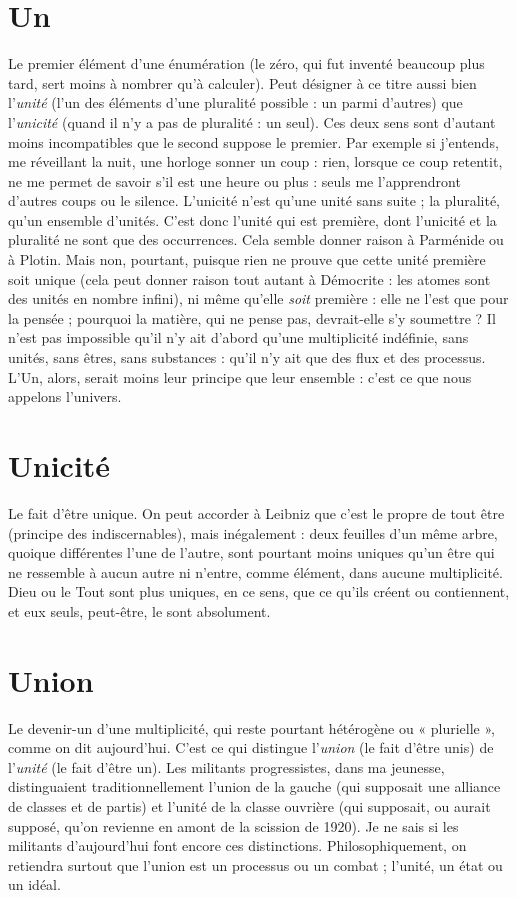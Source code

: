 \section{Un}
Le premier élément d’une énumération (le zéro, qui fut inventé beaucoup
plus tard, sert moins à nombrer qu’à calculer). Peut désigner à ce
titre aussi bien l’{\it unité} (l’un des éléments d’une pluralité possible : un parmi
d’autres) que l’{\it unicité} (quand il n’y a pas de pluralité : un seul). Ces deux
sens sont d’autant moins incompatibles que le second suppose le premier.
Par exemple si j'entends, me réveillant la nuit, une horloge sonner un coup :
rien, lorsque ce coup retentit, ne me permet de savoir s’il est une heure ou
plus : seuls me l’apprendront d’autres coups ou le silence. L’unicité n’est
qu’une unité sans suite ; la pluralité, qu’un ensemble d’unités. C’est donc
l'unité qui est première, dont l’unicité et la pluralité ne sont que des occurrences.
Cela semble donner raison à Parménide ou à Plotin. Mais non, pourtant,
puisque rien ne prouve que cette unité première soit unique (cela peut
donner raison tout autant à Démocrite : les atomes sont des unités en
nombre infini), ni même qu’elle {\it soit} première : elle ne l’est que pour la
pensée ; pourquoi la matière, qui ne pense pas, devrait-elle s’y soumettre ? Il
n’est pas impossible qu’il n’y ait d’abord qu’une multiplicité indéfinie, sans
unités, sans êtres, sans substances : qu’il n’y ait que des flux et des processus.
L'Un, alors, serait moins leur principe que leur ensemble : c’est ce que nous
appelons l’univers.

\section{Unicité}
Le fait d’être unique. On peut accorder à Leibniz que c’est le
propre de tout être (principe des indiscernables), mais inégalement :
deux feuilles d’un même arbre, quoique différentes l’une de l’autre, sont
pourtant moins uniques qu'un être qui ne ressemble à aucun autre ni n’entre,
comme élément, dans aucune multiplicité. Dieu ou le Tout sont plus uniques,
en ce sens, que ce qu'ils créent ou contiennent, et eux seuls, peut-être, le sont
absolument.

\section{Union}
Le devenir-un d’une multiplicité, qui reste pourtant hétérogène ou
« plurielle », comme on dit aujourd’hui. C’est ce qui distingue
l'{\it union} (le fait d’être unis) de l’{\it unité} (le fait d’être un). Les militants progressistes,
dans ma jeunesse, distinguaient traditionnellement l’union de la gauche
(qui supposait une alliance de classes et de partis) et l’unité de la classe ouvrière
(qui supposait, ou aurait supposé, qu’on revienne en amont de la scission de
1920). Je ne sais si les militants d’aujourd’hui font encore ces distinctions. Philosophiquement,
on retiendra surtout que l’union est un processus ou un
combat ; l’unité, un état ou un idéal.

